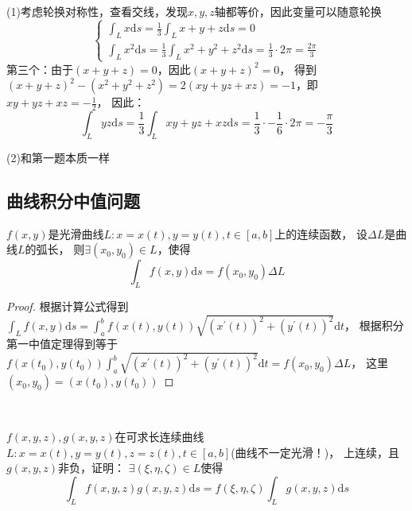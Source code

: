 \begin{solution}
  (1)考虑轮换对称性，查看交线，发现$x,y,z$轴都等价，因此变量可以随意轮换
  \begin{equation*}
    \begin{cases}
      \int_Lx\mathrm{d} s = \frac{1}{3}\int_L x+y+z \mathrm{d} s = 0\\
      \int_Lx^2 \mathrm{d} s = \frac{1}{3} \int_L x^2 + y^2 + z^2 \mathrm{d} s = \frac{1}{3} \cdot 2\pi = \frac{2\pi}{3}
    \end{cases}
  \end{equation*}
  第三个：由于$(x+y+z) = 0$，因此$(x+y+z)^2 = 0$，
  得到$(x+y+z)^2 - (x^2 + y^2 + z^2) = 2(xy + yz + xz) = -1$，即$xy + yz + xz = - \frac{1}{2}$，
  因此：
  \begin{equation*}
    \int_Lyz \mathrm{d} s = \frac{1}{3}\int_L xy + yz + xz \mathrm{d} s = \frac{1}{3} \cdot -\frac{1}{6} \cdot 2\pi = -\frac{\pi}{3}
  \end{equation*}

  (2)和第一题本质一样
\end{solution}

\subsection{曲线积分中值问题}

\begin{theorem}[曲线积分中值定理]
  $f(x,y)$是光滑曲线$L:x = x(t),y = y(t), t \in [a,b]$上的连续函数，
  设$\Delta L$是曲线$L$的弧长，
  则$\exists (x_0,y_0) \in L$，使得
  \begin{equation*}
    \int_Lf(x,y)\mathrm{d} s = f(x_0,y_0)\Delta L
  \end{equation*}
\end{theorem}

\begin{proof}
  根据计算公式得到$\int_Lf(x,y)\mathrm{d} s = \int_a^b f(x(t),y(t))\sqrt{(x^{\prime}(t))^2 + (y^{\prime}(t))^2}\mathrm{d} t$，
  根据积分第一中值定理得到等于
  $f(x(t_0),y(t_0)) \int_a^b \sqrt{(x^{\prime}(t))^2 + (y^{\prime}(t))^2}\mathrm{d} t = f(x_0,y_0) \Delta L$，
  这里$(x_0,y_0) = (x(t_0),y(t_0))$
\end{proof}

~

\begin{exercise}[积分第一中值定理的曲线推广]
  $f(x,y,z),g(x,y,z)$在可求长连续曲线$L:x = x(t),y = y(t), z = z(t), t \in [a,b]$(曲线不一定光滑！)，
  上连续，且$g(x,y,z)$非负，证明：
  $\exists (\xi,\eta,\zeta) \in L$使得
  \begin{equation*}
    \int_Lf(x,y,z)g(x,y,z)\mathrm{d} s = f(\xi,\eta,\zeta) \int_Lg(x,y,z)\mathrm{d} s
  \end{equation*}
\end{exercise}

